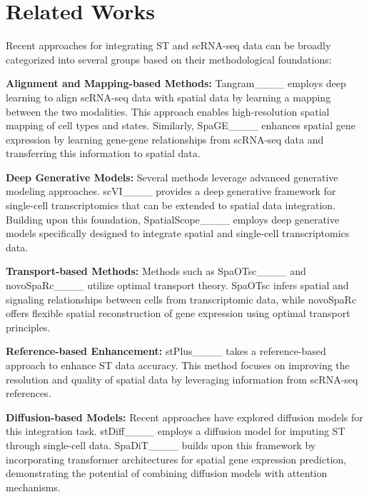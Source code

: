 \section{Related Works}
Recent approaches for integrating ST and scRNA-seq data can be broadly categorized into several groups based on their methodological foundations:

\textbf{Alignment and Mapping-based Methods:} Tangram____ employs deep learning to align scRNA-seq data with spatial data by learning a mapping between the two modalities. This approach enables high-resolution spatial mapping of cell types and states. Similarly, SpaGE____ enhances spatial gene expression by learning gene-gene relationships from scRNA-seq data and transferring this information to spatial data.

\textbf{Deep Generative Models:} Several methods leverage advanced generative modeling approaches. scVI____ provides a deep generative framework for single-cell transcriptomics that can be extended to spatial data integration. Building upon this foundation, SpatialScope____ employs deep generative models specifically designed to integrate spatial and single-cell transcriptomics data.

\textbf{Transport-based Methods:} Methods such as SpaOTsc____ and novoSpaRc____ utilize optimal transport theory. SpaOTsc infers spatial and signaling relationships between cells from transcriptomic data, while novoSpaRc offers flexible spatial reconstruction of gene expression using optimal transport principles.

\textbf{Reference-based Enhancement:} stPlus____ takes a reference-based approach to enhance ST data accuracy. This method focuses on improving the resolution and quality of spatial data by leveraging information from scRNA-seq references.

\textbf{Diffusion-based Models:} Recent approaches have explored diffusion models for this integration task. stDiff____ employs a diffusion model for imputing ST through single-cell data. SpaDiT____ builds upon this framework by incorporating transformer architectures for spatial gene expression prediction, demonstrating the potential of combining diffusion models with attention mechanisms.

